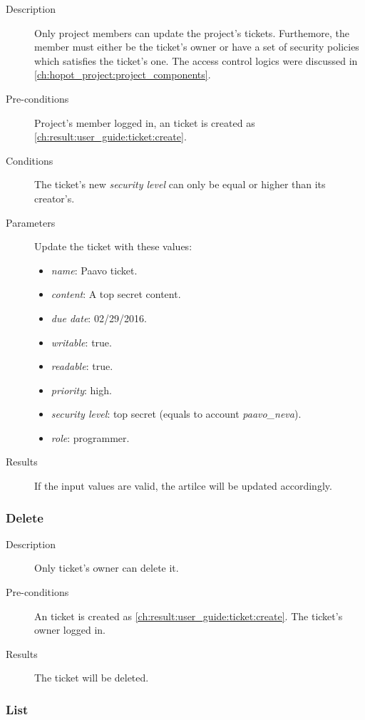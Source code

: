 \begin{description}
\item[Description] Only project members can update the project's tickets.
Furthemore, the member must either be the ticket's owner or have a set of security policies which satisfies the ticket's one.
The access control logics were discussed in \autoref{ch:hopot_project:project_components}.
\item[Pre-conditions] Project's member logged in, an ticket is created as \autoref{ch:result:user_guide:ticket:create}.
\item[Conditions] The ticket's new \emph{security level} can only be equal or higher than its creator's.
\item[Parameters] Update the ticket with these values:
\begin{itemize}
\item \emph{name}: Paavo ticket.
\item \emph{content}: A top secret content.
\item \emph{due date}: 02/29/2016.
\item \emph{writable}: true.
\item \emph{readable}: true.
\item \emph{priority}: high.
\item \emph{security level}: top secret (equals to account \emph{paavo\_neva}).
\item \emph{role}: programmer.
\end{itemize}
\item[Results] If the input values are valid, the artilce will be updated accordingly.
\end{description}

\subsubsection{Delete}
\label{ch:result:user_guide:ticket:delete}

\begin{description}
\item[Description] Only ticket's owner can delete it.
\item[Pre-conditions] An ticket is created as \autoref{ch:result:user_guide:ticket:create}.
The ticket's owner logged in.
\item[Results] The ticket will be deleted.
\end{description}

\subsubsection{List}
\label{ch:result:user_guide:ticket:list}

